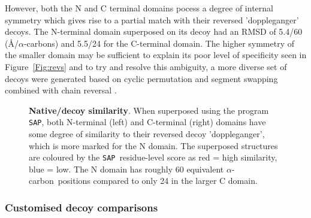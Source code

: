 \documentclass{bmcart}
\newcommand{\CA}{$\alpha$-carbon}
\newcommand{\SAP}{{\tt SAP}}
\newcommand{\Fig}[1]{Figure~\ref{Fig:#1}}
\begin{document}
However, both the N and C terminal domains pocess a degree of internal symmetry which gives
rise to a partial match with their reversed 'doppleganger' decoys.   The N-terminal domain superposed on its decoy
had an RMSD of 5.4/60 (\AA/\CA s) and 5.5/24 for the C-terminal domain.   The higher symmetry of the smaller
domain may be sufficient to explain its poor level of specificity seen in \Fig{revs} and to try and resolve this
ambiguity, a more diverse set of decoys were generated based on cyclic permutation and segment swapping combined
with chain reversal \cite{TaylorWR06a}.

\begin{figure}
\centering
{}
\begin{footnotesize}
\caption{
\label{Fig:tows}
{\bf Native/decoy similarity}.
When superposed using the program \SAP, both N-terminal (left) and C-terminal (right) domains
have some degree of similarity to their reversed decoy 'doppleganger', which is more marked
for the N domain.   The superposed structures are coloured by the \SAP\ residue-level score as
red = high similarity, blue = low.  The N domain has roughly 60 equivalent \CA\ positions
compared to only 24 in the larger C domain.
}
\end{footnotesize}
\end{figure}

\subsubsection*{Customised decoy comparisons}
\end{document}
